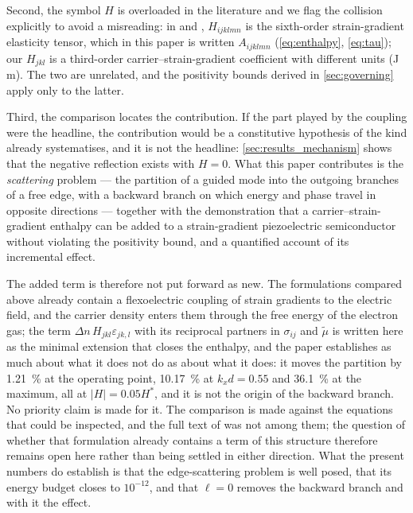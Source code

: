 Second, the symbol $H$ is overloaded in the literature and we flag the collision
explicitly to avoid a misreading: in \cite{qu2025thermodynamic} and
\cite{hu2025computational}, $H_{ijklmn}$ is the sixth-order strain-gradient
elasticity tensor, which in this paper is written $A_{ijklmn}$ (\cref{eq:enthalpy}, \cref{eq:tau});
our $H_{jkl}$ is a third-order carrier--strain-gradient
coefficient with different units (J\,m).  The two are unrelated, and the
positivity bounds derived in \cref{sec:governing} apply only to the latter.

Third, the comparison locates the contribution.  If the part played by the
coupling were the headline, the contribution would be a constitutive hypothesis
of the kind \cite{qu2025thermodynamic} already systematises, and it is not the
headline: \cref{sec:results_mechanism} shows that the negative reflection exists
with $H=0$.  What this paper contributes is the \emph{scattering} problem --- the
partition of a guided mode into the outgoing branches of a free edge, with a
backward branch on which energy and phase travel in opposite directions ---
together with the demonstration that a carrier--strain-gradient enthalpy can be
added to a strain-gradient piezoelectric semiconductor without violating the
positivity bound, and a quantified account of its incremental effect.

The added term is therefore not put forward as new.  The formulations compared
above already contain a flexoelectric coupling of strain gradients to the
electric field, and the carrier density enters them through the free energy of
the electron gas; the term $\Delta n\,H_{jkl}\varepsilon_{jk,l}$ with its
reciprocal partners in $\sigma_{ij}$ and $\widetilde\mu$ is written here as the
minimal extension that closes the enthalpy, and the paper establishes as much
about what it does not do as about what it does: it moves the partition by
\SI{1.21}{\percent} at the operating point, \SI{10.17}{\percent} at
$k_xd=0.55$ and \SI{36.1}{\percent} at the maximum, all at $|H|=0.05H^{*}$, and
it is not the origin of the backward branch.  No priority claim is made for it.
The comparison is made against the equations that could be inspected, and the
full text of \cite{qu2025thermodynamic} was not among them; the question of
whether that formulation already contains a term of this structure therefore
remains open here rather than being settled in either direction.  What the
present numbers do establish is that the edge-scattering problem is well posed,
that its energy budget closes to $10^{-12}$, and that $\ell=0$ removes the
backward branch and with it the effect.

